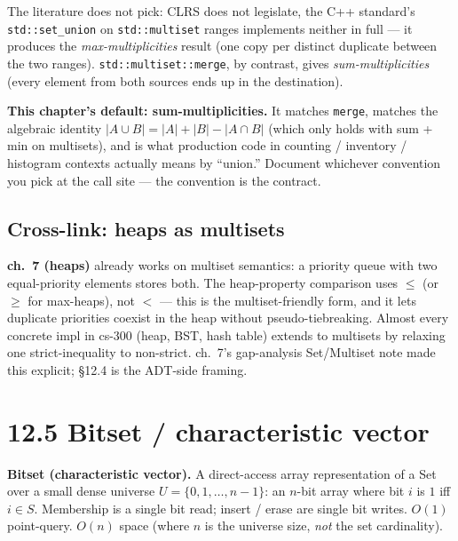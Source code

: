 \documentclass[11pt]{article}
\begin{document}
\begin{notebox}
The literature does not pick: CLRS does not legislate, the C++
standard's \texttt{std::set\_union} on \texttt{std::multiset} ranges
implements neither in full --- it produces the
\emph{max-multiplicities} result (one copy per distinct duplicate
between the two ranges). \texttt{std::multiset::merge}, by contrast,
gives \emph{sum-multiplicities} (every element from both sources
ends up in the destination).

\textbf{This chapter's default: sum-multiplicities.} It matches
\texttt{merge}, matches the algebraic identity
$|A \cup B| = |A| + |B| - |A \cap B|$ (which only holds with sum
+ min on multisets), and is what production code in counting /
inventory / histogram contexts actually means by ``union.''
Document whichever convention you pick at the call site --- the
convention is the contract.
\end{notebox}

\subsection*{Cross-link: heaps as multisets}

\textbf{ch.~7 (heaps)} already works on multiset semantics: a
priority queue with two equal-priority elements stores both. The
heap-property comparison uses $\le$ (or $\ge$ for max-heaps), not
$<$ --- this is the multiset-friendly form, and it lets duplicate
priorities coexist in the heap without pseudo-tiebreaking. Almost
every concrete impl in cs-300 (heap, BST, hash table) extends to
multisets by relaxing one strict-inequality to non-strict. ch.~7's
gap-analysis Set/Multiset note made this explicit; \S12.4 is the
ADT-side framing.

\section{12.5 Bitset / characteristic vector}

\begin{defnbox}
\textbf{Bitset (characteristic vector).} A direct-access array
representation of a Set over a small dense universe
$U = \{0, 1, \ldots, n-1\}$: an $n$-bit array where bit $i$ is $1$
iff $i \in S$. Membership is a single bit read; insert / erase are
single bit writes. $O(1)$ point-query. $O(n)$ space (where $n$ is
the universe size, \emph{not} the set cardinality).
\end{defnbox}
\end{document}
